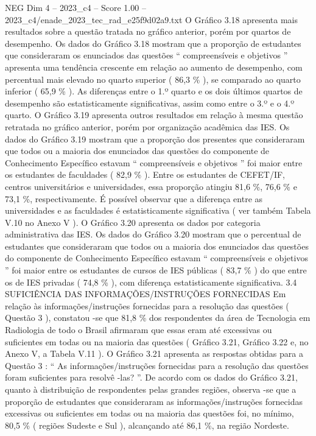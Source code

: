 \begin{textsample}{NEG Dim 4 – 2023\_c4 – Score 1.00 – 2023\_c4/enade\_2023\_tec\_rad\_e25f9d02a9.txt}
O Gráfico 3.18 apresenta mais resultados sobre a questão tratada no gráfico anterior, porém por quartos de desempenho.
Os dados do Gráfico 3.18 mostram que a proporção de estudantes que consideraram os enunciados das questões “ compreensíveis e objetivos ” apresenta uma tendência crescente em relação ao aumento de desempenho, com percentual mais elevado no quarto superior ( 86,3 \% ), se comparado ao quarto inferior ( 65,9 \% ).
As diferenças entre o 1.º quarto e os dois últimos quartos de desempenho são estatisticamente significativas, assim como entre o 3.º e o 4.º quarto.
O Gráfico 3.19 apresenta outros resultados em relação à mesma questão retratada no gráfico anterior, porém por organização acadêmica das IES.
Os dados do Gráfico 3.19 mostram que a proporção dos presentes que consideraram que todos ou a maioria dos enunciados das questões do componente de Conhecimento Específico estavam “ compreensíveis e objetivos ” foi maior entre os estudantes de faculdades ( 82,9 \% ).
Entre os estudantes de CEFET/IF, centros universitários e universidades, essa proporção atingiu 81,6 \%, 76,6 \% e 73,1 \%, respectivamente.
É possível observar que a diferença entre as universidades e as faculdades é estatisticamente significativa ( ver também Tabela V.10 no Anexo V ).
O Gráfico 3.20 apresenta os dados por categoria administrativa das IES.
Os dados do Gráfico 3.20 mostram que o percentual de estudantes que consideraram que todos ou a maioria dos enunciados das questões do componente de Conhecimento Específico estavam “ compreensíveis e objetivos ” foi maior entre os estudantes de cursos de IES públicas ( 83,7 \% ) do que entre os de IES privadas ( 74,8 \% ), com diferença estatisticamente significativa. 3.4 SUFICIÊNCIA DAS INFORMAÇÕES/INSTRUÇÕES FORNECIDAS Em relação às informações/instruções fornecidas para a resolução das questões ( Questão 3 ), constatou -se que 81,8 \% dos respondentes da área de Tecnologia em Radiologia de todo o Brasil afirmaram que essas eram até excessivas ou suficientes em todas ou na maioria das questões ( Gráfico 3.21, Gráfico 3.22 e, no Anexo V, a Tabela V.11 ).
O Gráfico 3.21 apresenta as respostas obtidas para a Questão 3 : “ As informações/instruções fornecidas para a resolução das questões foram suficientes para resolvê -las? ”.
De acordo com os dados do Gráfico 3.21, quanto à distribuição de respondentes pelas grandes regiões, observa -se que a proporção de estudantes que consideraram as informações/instruções fornecidas excessivas ou suficientes em todas ou na maioria das questões foi, no mínimo, 80,5 \% ( regiões Sudeste e Sul ), alcançando até 86,1 \%, na região Nordeste.

\end{textsample}
